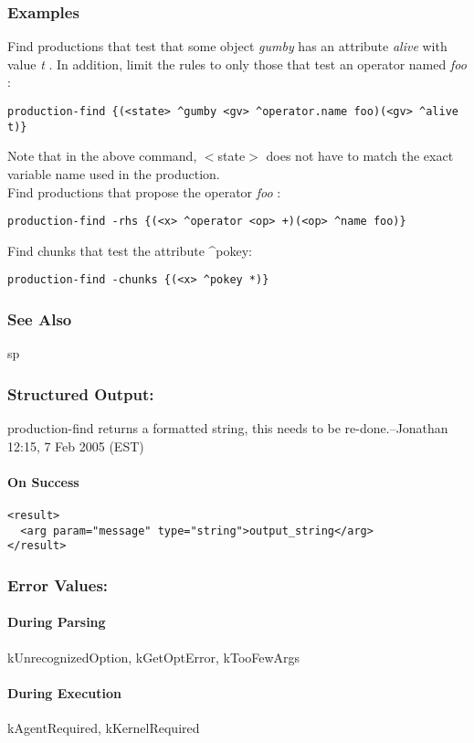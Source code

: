 \subsubsection*{Examples}
 Find productions that test that some object \emph{gumby}
 has an attribute \emph{alive}
 with value \emph{t}
. In addition, limit the rules to only those that test an operator named \emph{foo}
: \begin{verbatim}
production-find {(<state> ^gumby <gv> ^operator.name foo)(<gv> ^alive t)} 
\end{verbatim}
 Note that in the above command, $<$state$>$ does not have to match the exact variable name used in the production. \\ 
 Find productions that propose the operator \emph{foo}
: \begin{verbatim}
production-find -rhs {(<x> ^operator <op> +)(<op> ^name foo)}
\end{verbatim}
 Find chunks that test the attribute \^{}pokey: \begin{verbatim}
production-find -chunks {(<x> ^pokey *)}
\end{verbatim}
\subsubsection*{See Also}
 sp
\subsubsection*{Structured Output:}
 production-find returns a formatted string, this needs to be re-done.--Jonathan 12:15, 7 Feb 2005 (EST) 
\paragraph*{On Success}
\begin{verbatim}
<result>
  <arg param="message" type="string">output_string</arg>
</result>
\end{verbatim}
\subsubsection*{Error Values:}
\paragraph*{During Parsing}
 kUnrecognizedOption, kGetOptError, kTooFewArgs
\paragraph*{During Execution}
 kAgentRequired, kKernelRequired
